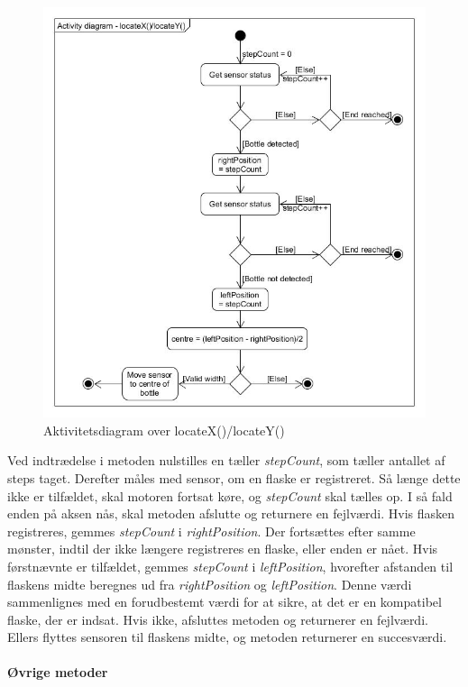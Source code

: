 \begin{figure}[H]
	\centerline{\includegraphics[scale=0.5]{tex/Design/PSoC/AD_locate.jpg}}
	\caption{Aktivitetsdiagram over locateX()/locateY()}
	\label{AD_locate}
\end{figure}

Ved indtrædelse i metoden nulstilles en tæller \textit{stepCount}, som tæller antallet af steps taget. Derefter måles med sensor, om en flaske er registreret. Så længe dette ikke er tilfældet, skal motoren fortsat køre, og \textit{stepCount} skal tælles op. I så fald enden på aksen nås, skal metoden afslutte og returnere en fejlværdi. Hvis flasken registreres, gemmes \textit{stepCount} i \textit{rightPosition}. Der fortsættes efter samme mønster, indtil der ikke længere registreres en flaske, eller enden er nået. Hvis førstnævnte er tilfældet, gemmes \textit{stepCount} i \textit{leftPosition}, hvorefter afstanden til flaskens midte beregnes ud fra \textit{rightPosition} og \textit{leftPosition}. Denne værdi sammenlignes med en forudbestemt værdi for at sikre, at det er en kompatibel flaske, der er indsat. Hvis ikke, afsluttes metoden og returnerer en fejlværdi. Ellers flyttes sensoren til flaskens midte, og metoden returnerer en succesværdi.
\\
\\
\textbf{Øvrige metoder}


